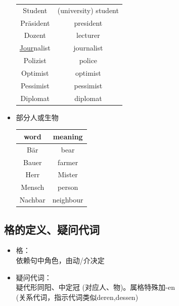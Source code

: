 \begin{itemize}
\begin{center}
\begin{tabular}{|c|c|}
                  Student                & (university) student \\
                  Präsident              & president            \\
                  Dozent                 & lecturer             \\
                  \hline
                  \underline{Jour}nalist & journalist           \\
                  Polizist               & police               \\
                  Optimist               & optimist             \\
                  Pessimist              & pessimist            \\
                  \hline
                  Diplomat               & diplomat             \\
                  \hline
              \end{tabular}
          \end{center}
    \item 部分人或生物
          \begin{center}
              \begin{tabular}{|c|c|}
                  \hline
                  \rowcolor{gray}
                  word    & meaning   \\
                  \hline
                  Bär     & bear      \\
                  \hline
                  Bauer   & farmer    \\
                  Herr    & Mister    \\
                  Mensch  & person    \\
                  Nachbar & neighbour \\
                  \hline
              \end{tabular}
          \end{center}
\end{itemize}


\subsection{格的定义、疑问代词}
\label{subsec:noun:inqpron}
\begin{itemize}
    \item 格：\\
          依赖句中角色，由动/介决定
    \item 疑问代词：\\
          疑代形同阳、中定冠 (对应人、物)。属格特殊加-en \\
          (关系代词，指示代词类似deren,dessen)
\end{itemize}


